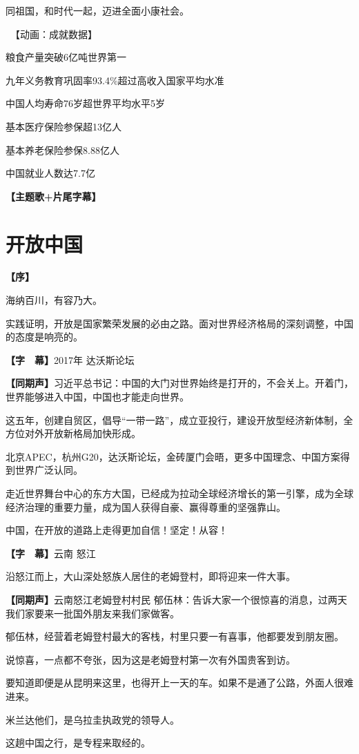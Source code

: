 \documentclass{ctexart}
\newcommand{\zkh}[1]{\textbf{\hspace{-2.7em} 【#1】}}
\begin{document}
 同祖国，和时代一起，迈进全面小康社会。

 　【动画：成就数据】 
 
 粮食产量突破6亿吨世界第一

 九年义务教育巩固率93.4{\%}超过高收入国家平均水准

 中国人均寿命76岁超世界平均水平5岁

 基本医疗保险参保超13亿人

 基本养老保险参保8.88亿人

中国就业人数达7.7亿

\zkh{主题歌+片尾字幕}

\newpage\part{开放中国}

\zkh{序}

海纳百川，有容乃大。

实践证明，开放是国家繁荣发展的必由之路。面对世界经济格局的深刻调整，中国的态度是响亮的。

\zkh{字　幕}2017年 达沃斯论坛

\zkh{同期声}习近平总书记：中国的大门对世界始终是打开的，不会关上。开着门，世界能够进入中国，中国也才能走向世界。

这五年，创建自贸区，倡导``一带一路''，成立亚投行，建设开放型经济新体制，全方位对外开放新格局加快形成。

北京APEC，杭州G20，达沃斯论坛，金砖厦门会晤，更多中国理念、中国方案得到世界广泛认同。

走近世界舞台中心的东方大国，已经成为拉动全球经济增长的第一引擎，成为全球经济治理的重要力量，成为国人获得自豪、赢得尊重的坚强靠山。

中国，在开放的道路上走得更加自信！坚定！从容！

\zkh{字　幕}云南 怒江

沿怒江而上，大山深处怒族人居住的老姆登村，即将迎来一件大事。

\zkh{同期声}云南怒江老姆登村村民 郁伍林：告诉大家一个很惊喜的消息，过两天我们家要来一批国外朋友来我们家做客。

郁伍林，经营着老姆登村最大的客栈，村里只要一有喜事，他都要发到朋友圈。

说惊喜，一点都不夸张，因为这是老姆登村第一次有外国贵客到访。

要知道即便是从昆明来这里，也得开上一天的车。如果不是通了公路，外面人很难进来。

米兰达他们，是乌拉圭执政党的领导人。

这趟中国之行，是专程来取经的。
\end{document}
